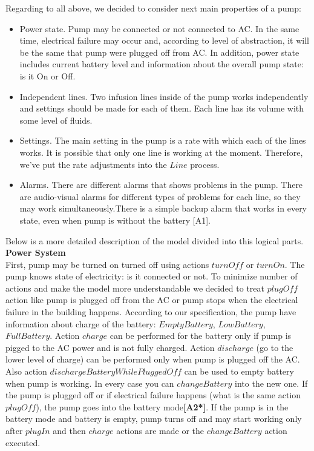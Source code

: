 \documentclass{article}
\begin{document}
Regarding to all above, we decided to consider next main properties of a pump: \\
\begin{itemize}
\item Power state. Pump may be connected or not connected to AC. In the same time, electrical failure may occur and, according to level of abstraction, it will be the same that pump were plugged off from AC. In addition, power state includes current battery level and information about the overall pump state: is it On or Off.
\item Independent lines. Two infusion lines inside of the pump works independently and settings should be made for each of them. Each line has its volume with some level of fluids. 
\item Settings. The main setting in the pump is a rate with which each of the lines works. It is possible that only one line is working at the moment. Therefore, we’ve put the rate adjustments into the $Line$ process.
\item Alarms. There are different alarms that shows problems in the pump. There are audio-visual alarms for different types of problems for each line, so they may work simultaneously.There is a simple backup alarm that works in every state, even when pump is without the battery [A1].
\end{itemize}
Below is a more detailed description of the model divided into this logical parts.\\

\textbf{Power System} \\

First, pump may be turned on turned off using actions $turnOff$ or $turnOn$. The pump knows state of electricity: is it connected or not. To minimize number of actions and make the model more understandable we decided to treat $plugOff$ action like pump is plugged off from the AC or pump stops when the electrical failure in the building happens.
According to our specification, the pump have information about charge of the battery: $EmptyBattery$, $LowBattery$, $FullBattery$. Action $charge$ can be performed for the battery only if pump is pigged to the AC power and is not fully charged. Action $discharge$ (go to the lower level of charge) can be performed only when pump is plugged off the AC. Also action $dischargeBatteryWhilePluggedOff$ can be used to empty battery when pump is working. In every case you can $changeBattery$ into the new one.
If the pump is plugged off or if electrical failure happens (what is the same action $plugOff$), the pump goes into the battery mode\textbf{[A2*]}.
If the pump is in the battery mode and battery is empty, pump turns off and may start working only after $plugIn$ and then $charge$ actions are made or the $changeBattery$ action executed.\\
\end{document}
